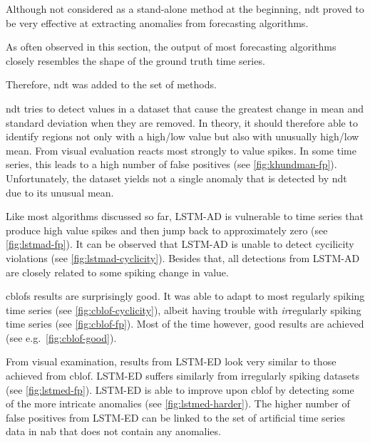 \begin{description}[style=unboxed,leftmargin=0cm]
    \item[Nonparametric Dynamic Thresholding~\cite{Hundman.2018}] Although not
    considered as a stand-alone method at the beginning, \gls{ndt} proved to be
    very effective at extracting anomalies from forecasting algorithms.
    
    As often observed in this section, the output of most forecasting algorithms
    closely resembles the shape of the ground truth time series.
    
    Therefore, \gls{ndt} was added to the set of methods.
    
    \gls{ndt} tries to detect values in a dataset that cause the greatest change
    in mean and standard deviation when they are removed. In theory, it should
    therefore able to identify regions not only with a high/low value but also
    with unusually high/low mean. From visual evaluation reacts most strongly to
    value spikes. In some time series, this leads to a high number of false positives
    (see \cref{fig:khundman-fp}). Unfortunately, the dataset yields not a single
    anomaly that is detected by \gls{ndt} due to its unusual mean.
    \item[LSTM-AD] Like most algorithms discussed so far, LSTM-AD is vulnerable
    to time series that produce high value spikes and then jump back to approximately
    zero (see \cref{fig:lstmad-fp}). It can be observed that LSTM-AD is unable to detect
    cycilicity violations (see \cref{fig:lstmad-cyclicity}). Besides that, all
    detections from LSTM-AD are closely related to some spiking change in
    value.
    \item[CBLOF] \gls{cblof}s results are surprisingly good. It was able to adapt
    to most regularly spiking time series (see \cref{fig:cblof-cyclicity}), albeit having trouble
    with \textit{ir}regularly spiking time series (see \cref{fig:cblof-fp}). Most of the
    time however, good results are achieved (see e.g.\ \cref{fig:cblof-good}).
    \item[LSTM-ED] From visual examination, results from LSTM-ED look very similar
    to those achieved from \gls{cblof}. LSTM-ED suffers similarly from irregularly
    spiking datasets (see \cref{fig:lstmed-fp}). LSTM-ED is able to improve upon \gls{cblof}
    by detecting some of the more intricate anomalies (see \cref{fig:lstmed-harder}). The
    higher number of false positives from LSTM-ED can be linked to the set of
    artificial time series data in \gls{nab} that does not contain any anomalies.

\end{description}
